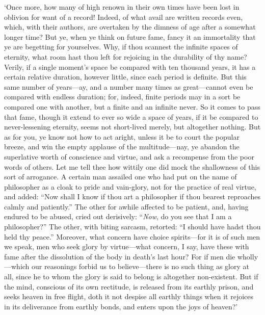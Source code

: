 \documentclass[12pt]{book}
\begin{document}
`Once more, how many of high renown in their own times have been lost in
oblivion for want of a record! Indeed, of what avail are written records
even, which, with their authors, are overtaken by the dimness of age
after a somewhat longer time? But ye, when ye think on future fame,
fancy it an immortality that ye are begetting for yourselves. Why, if
thou scannest the infinite spaces of eternity, what room hast thou left
for rejoicing in the durability of thy name? Verily, if a single
moment's space be compared with ten thousand years, it has a certain
relative duration, however little, since each period is definite. But
this same number of years---ay, and a number many times as great---cannot
even be compared with endless duration; for, indeed, finite periods may
in a sort be compared one with another, but a finite and an infinite
never. So it comes to pass that fame, though it extend to ever so wide a
space of years, if it be compared to never-lessening eternity, seems not
short-lived merely, but altogether nothing. But as for you, ye know not
how to act aright, unless it be to court the popular breeze, and win the
empty applause of the multitude---nay, ye abandon the superlative worth
of conscience and virtue, and ask a recompense from the poor words of
others. Let me tell thee how wittily one did mock the shallowness of
this sort of arrogance. A certain man assailed one who had put on the
name of philosopher as a cloak to pride and vain-glory, not for the
practice of real virtue, and added: ``Now shall I know if thou art a
philosopher if thou bearest reproaches calmly and patiently.'' The other
for awhile affected to be patient, and, having endured to be abused,
cried out derisively: ``\emph{Now}, do you see that I am a philosopher?'' The
other, with biting sarcasm, retorted: ``I should have hadst thou held thy
peace.'' Moreover, what concern have choice spirits---for it is of such
men we speak, men who seek glory by virtue---what concern, I say, have
these with fame after the dissolution of the body in death's last hour?
For if men die wholly---which our reasonings forbid us to believe---there
is no such thing as glory at all, since he to whom the glory is said to
belong is altogether non-existent. But if the mind, conscious of its own
rectitude, is released from its earthly prison, and seeks heaven in free
flight, doth it not despise all earthly things when it rejoices in its
deliverance from earthly bonds, and enters upon the joys of heaven?'



\end{document}
